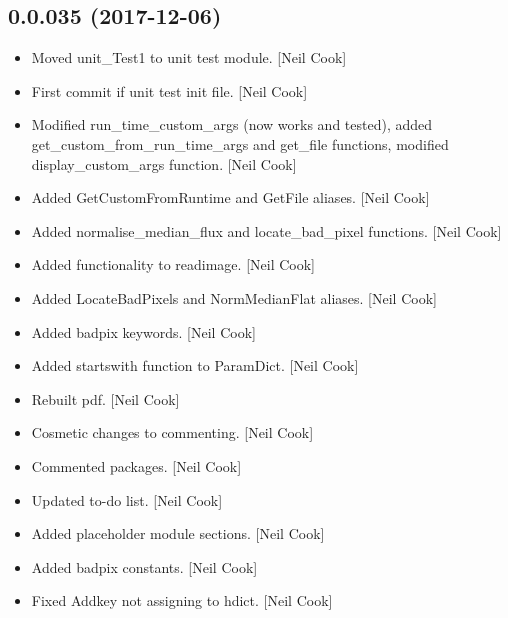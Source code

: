 \documentclass[a4paper,10pt,english]{report}
\begin{document}
\subsection{0.0.035 (2017-12-06)}
\label{\detokenize{misc/changelog:id515}}\begin{itemize}
\item {} 
Moved unit\_Test1 to unit test module. {[}Neil Cook{]}

\item {} 
First commit if unit test init file. {[}Neil Cook{]}

\item {} 
Modified run\_time\_custom\_args (now works and tested), added
get\_custom\_from\_run\_time\_args and get\_file functions, modified
display\_custom\_args function. {[}Neil Cook{]}

\item {} 
Added GetCustomFromRuntime and GetFile aliases. {[}Neil Cook{]}

\item {} 
Added normalise\_median\_flux and locate\_bad\_pixel functions. {[}Neil
Cook{]}

\item {} 
Added functionality to readimage. {[}Neil Cook{]}

\item {} 
Added LocateBadPixels and NormMedianFlat aliases. {[}Neil Cook{]}

\item {} 
Added badpix keywords. {[}Neil Cook{]}

\item {} 
Added startswith function to ParamDict. {[}Neil Cook{]}

\item {} 
Rebuilt pdf. {[}Neil Cook{]}

\item {} 
Cosmetic changes to commenting. {[}Neil Cook{]}

\item {} 
Commented packages. {[}Neil Cook{]}

\item {} 
Updated to-do list. {[}Neil Cook{]}

\item {} 
Added placeholder module sections. {[}Neil Cook{]}

\item {} 
Added badpix constants. {[}Neil Cook{]}

\item {} 
Fixed Addkey not assigning to hdict. {[}Neil Cook{]}


\end{itemize}
\end{document}

